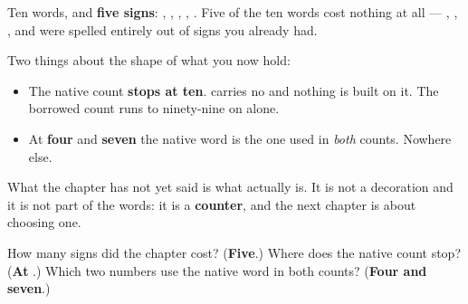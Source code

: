 \begin{grammarlens}[title={What you've built this chapter}]
Ten words, and \textbf{five signs}: \textbf{}, \textbf{}, \textbf{}, \textbf{}, \textbf{}. Five of the ten words cost nothing at all — \textbf{}, \textbf{}, \textbf{}, \textbf{} and \textbf{} were spelled entirely out of signs you already had.

Two things about the shape of what you now hold:

\begin{itemize}
\raggedright
  \item The native count \textbf{stops at ten}. \textbf{} carries no \textbf{} and nothing is built on it. The borrowed count runs to ninety-nine on \textbf{} alone.
  \item At \textbf{four} and \textbf{seven} the native word is the one used in \emph{both} counts. Nowhere else.
\end{itemize}

What the chapter has not yet said is what \textbf{} actually is. It is not a decoration and it is not part of the words: it is a \textbf{counter}, and the next chapter is about choosing one.
\end{grammarlens}

\begin{tcolorbox}[breakable,colback=teal!4,colframe=teal!35!black,title={Before you move on}]
How many signs did the chapter cost? (\textbf{Five}.) Where does the native count stop? (\textbf{At }.) Which two numbers use the native word in both counts? (\textbf{Four and seven}.)
\end{tcolorbox}
